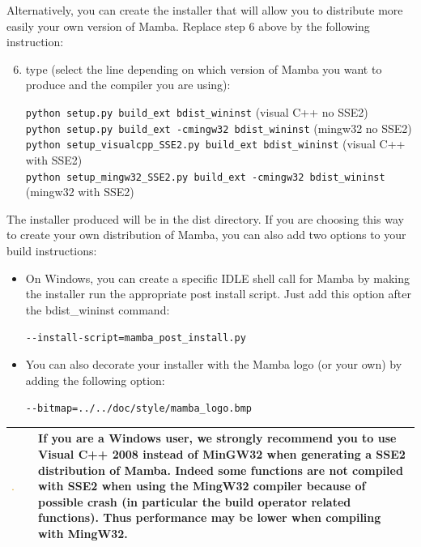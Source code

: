 \documentclass[a4paper,10pt,oneside]{article}
\newenvironment{warnBox}
{
    \begin{center}
    \begin{tabular}{ | b{0.1\textwidth} b{0.8\textwidth} | }
    \hline
    \rowcolor{yellow}
    \includegraphics[width=0.1\textwidth]{Crystal_Clear_app_error.png} &
}
{
    \\
    \hline
    \end{tabular}
    \end{center}
}
\begin{document}
Alternatively, you can create the installer that will allow you to 
distribute more easily your own version of Mamba. Replace step 6 above by the 
following instruction:

\begin{enumerate}
\setcounter{enumi}{5}
\item type (select the line depending on which version of Mamba you want to 
produce and the compiler you are using):

\texttt{python setup.py build\_ext bdist\_wininst} (visual C++ no SSE2)\\
\texttt{python setup.py build\_ext -cmingw32 bdist\_wininst} (mingw32 no SSE2)\\
\texttt{python setup\_visualcpp\_SSE2.py build\_ext bdist\_wininst} (visual C++ with SSE2)\\
\texttt{python setup\_mingw32\_SSE2.py build\_ext -cmingw32 bdist\_wininst} (mingw32 with SSE2)

\end{enumerate}

The installer produced will be in the dist directory. If you are choosing this
way to create your own distribution of Mamba, you can also add two options to
your build instructions:

\begin{itemize}
\item On Windows, you can create a specific IDLE shell call for Mamba by making
the installer run the appropriate post install script. Just add this option
after the bdist\_wininst command:

\texttt{-{}-install-script=mamba\_post\_install.py}

\item You can also decorate your installer with the Mamba logo (or your own) by
adding the following option:

\texttt{-{}-bitmap=../../doc/style/mamba\_logo.bmp}

\end{itemize}

\begin{warnBox}
If you are a Windows user, we strongly recommend you to use Visual C++ 2008 
instead of MinGW32 when generating a SSE2 distribution of Mamba. Indeed some
functions are not compiled with SSE2 when using the MingW32 compiler because
of possible crash (in particular the build operator related functions). Thus
performance may be lower when compiling with MingW32.
\end{warnBox}
\end{document}
